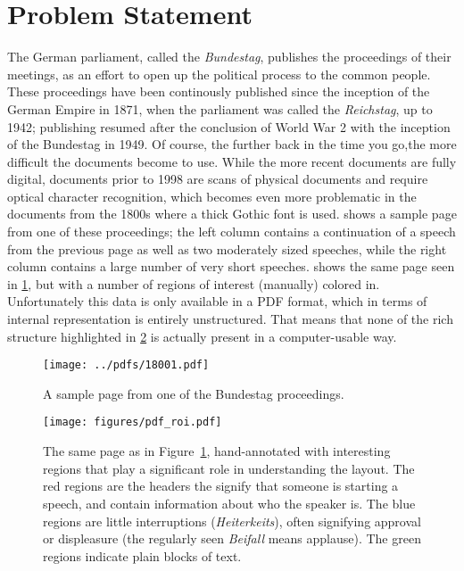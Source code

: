 \section{Problem Statement}%
\label{sec:problem}
The German parliament, called the \emph{Bundestag}, publishes the proceedings of
their meetings, as an effort to open up the political process to the common
people. These proceedings have been continously published since the inception of
the German Empire in 1871, when the parliament was called the \emph{Reichstag},
up to 1942; publishing resumed after the conclusion of World War 2 with the
inception of the Bundestag in 1949. Of course, the further back in the time you
go,the more difficult the documents become to use. While the more recent
documents are fully digital, documents prior to 1998 are scans of physical
documents and require optical character recognition, which becomes even more
problematic in the documents from the 1800s where a thick Gothic font is used.
 shows a sample page from one of these proceedings; the
left column contains a continuation of a speech from the previous page as well
as two moderately sized speeches, while the right column contains a large number
of very short speeches.  shows the same page seen in
\cref{fig:pdf_page}, but with a number of regions of interest (manually)
colored in. Unfortunately this data is only available in a PDF format, which in
terms of internal representation is entirely unstructured. That means that none
of the rich structure highlighted in \cref{fig:pdf_roi} is actually
present in a computer-usable way.

\begin{figure}[p]
  \centering
  \texttt{[image: ../pdfs/18001.pdf]}
  \caption{A sample page from one of the Bundestag
    proceedings.\label{fig:pdf_page}}
\end{figure}
\begin{figure}[p]
  \centering
  \texttt{[image: figures/pdf\_roi.pdf]}
  \caption{The same page as in Figure~\ref{fig:pdf_page}, hand-annotated with
    interesting regions that play a significant role in understanding the
    layout. The red regions are the headers the signify that someone is starting
    a speech, and contain information about who the speaker is. The blue
    regions are little interruptions (\emph{Heiterkeits}), often signifying
    approval or displeasure (the regularly seen \emph{Beifall} means applause).
  The green regions indicate plain blocks of text.\label{fig:pdf_roi}}
\end{figure}

